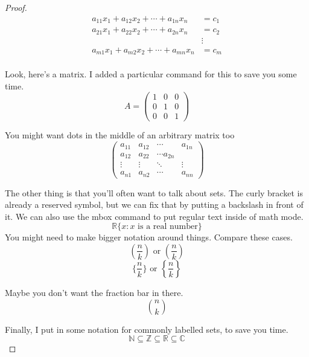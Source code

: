 \documentclass[12 pt]{article}
\theoremstyle{definition}
\newcommand{\C}{\mathbb{C}}
\newcommand{\R}{\mathbb{R}}
\newcommand{\N}{\mathbb{N}}
\newcommand{\Z}{\mathbb{Z}}
\newcommand\m[1]{\begin{pmatrix}#1\end{pmatrix}}
\begin{document}
\begin{proof}
\begin{align*}
    a_{11}x_1 + a_{12}x_2 + \cdots + a_{1n}x_n &= c_1\\
    a_{21}x_1 + a_{22}x_2 + \cdots + a_{2n}x_n &= c_2\\
    &\vdots\\
    a_{m1}x_1 + a_{m2}x_2 + \cdots + a_{mn}x_n &= c_m\\
\end{align*}


Look, here's a matrix. I added a particular command for this to save you some time.
$$A = \m{1&0&0\\0&1&0\\0&0&1}$$

You might want dots in the middle of an arbitrary matrix too
$$\m{a_{11}&a_{12}&\cdots& a_{1n}\\
a_{12}&a_{22}&\cdots a_{2n}\\
\vdots&\vdots&\ddots&\vdots\\
a_{n1}&a_{n2}&\cdots& a_{nn}}$$

The other thing is that you'll often want to talk about sets. The curly bracket is already a reserved symbol, but we can fix that by putting a backslash in front of it. We can also use the mbox command to put regular text inside of math mode.
$$\R \{x:x \mbox{ is a real number}\}$$
You might need to make bigger notation around things. Compare these cases.
$$(\frac{n}{k})\mbox{ or }\left(\frac{n}{k}\right)$$
$$\{\frac{n}{k}\}\mbox{ or }\left\{\frac{n}{k}\right\}$$

Maybe you don't want the fraction bar in there. 
$${n \choose k}$$

Finally, I put in some notation for commonly labelled sets, to save you time.
$$\N \subseteq \Z \subseteq \R \subseteq \C$$

\end{proof}

 
\end{document}
